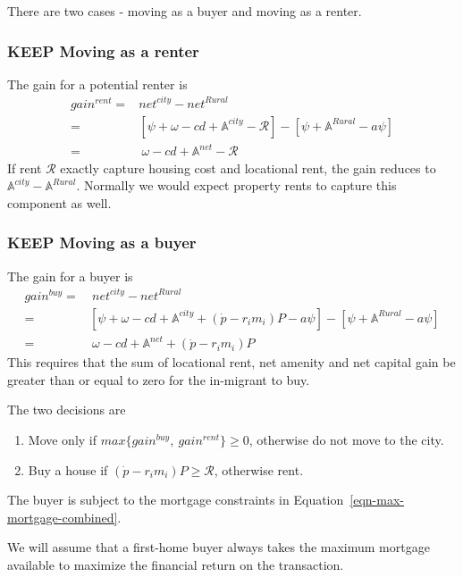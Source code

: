 {There are two cases - moving as a buyer and moving as a renter.

\subsubsection{KEEP Moving as a renter}
The gain for a potential renter is 
\begin{align}
gain^{rent}=&net^{city}-net^{Rural}\nonumber\\
=&\left[\psi+\omega-cd+\mathbb{A}^{city}-\mathcal{R}\right]-\left[\psi+\mathbb{A}^{Rural}-a\psi\right] \nonumber\\
=&\ \omega-cd+\mathbb{A}^{net}-\mathcal{R}
\label{eq-move-to-rent}
\end{align}
If rent $\mathcal{R}$ exactly capture housing cost and locational rent, the gain reduces to $\mathbb{A}^{city}-\mathbb{A}^{Rural}$. Normally we would expect property rents to capture this component  as well. 

\subsubsection{KEEP Moving as a buyer}
The gain for a buyer is 
\begin{align}
gain^{buy}=&\ net^{city}-net^{Rural}\nonumber\\
=&\left[\psi+\omega-cd+\mathbb{A}^{city}+(\dot p-r_im_i)P-a\psi\right]-\left[\psi+\mathbb{A}^{Rural}-a\psi\right] \nonumber\\
=&\ \omega-cd+\mathbb{A}^{net}+(\dot p-r_im_i)P  \label{eq-move-to-buy}
\end{align}
This requires that the sum of  locational rent, net amenity and net capital gain be greater than or equal to zero for the in-migrant to buy.

The two decisions  are 
\begin{enumerate}
    \item Move only if $max\{gain^{buy},\ gain^{rent}\} \ge 0$, otherwise do not move to the city.
    
    \item Buy a house if $(\dot p-r_im_i)P\ge  \mathcal{R}$, otherwise rent.
\end{enumerate}

The buyer is subject to the mortgage constraints in Equation~\ref{eqn-max-mortgage-combined}.

We will assume that a first-home buyer always takes the maximum mortgage available to maximize the financial return on the transaction. 

}
